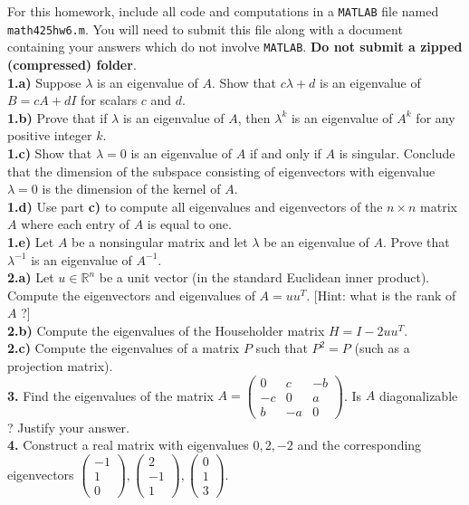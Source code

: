 \documentclass[11pt]{amsart}
\theoremstyle{definition}  %
\begin{document}


\noindent For this homework, include all code and computations in a {\tt MATLAB} file named {\tt math425hw6.m}.
You will need to submit this file along with a document containing your answers which do not
involve {\tt MATLAB}. {\bf Do not submit a zipped (compressed) folder}. \\

\noindent
{\bf 1.a)} Suppose $\lambda$ is an eigenvalue of $A$. Show that $c\lambda +d$ is an eigenvalue of $B = cA+dI$ for scalars $c$ and $d$.  \\
{\bf 1.b)} Prove that if $\lambda$ is an eigenvalue of $A$, then $\lambda^k$ is an eigenvalue of $A^k$ for any positive integer $k$. \\
{\bf 1.c)} Show that $\lambda = 0$ is an eigenvalue of $A$ if and only if $A$ is singular. Conclude that the dimension of the subspace consisting of eigenvectors
with eigenvalue $\lambda = 0$ is the dimension of the kernel of $A$.\\
{\bf 1.d)} Use part {\bf c)} to compute all eigenvalues and eigenvectors of the $n \times n$ matrix $A$ where each entry of $A$ is equal to one. \\
{\bf 1.e)} Let $A$ be a nonsingular matrix and let $\lambda$ be an eigenvalue of $A$. Prove that $\lambda^{-1}$ is an eigenvalue of $A^{-1}$. \\

\noindent
{\bf 2.a)}  Let $u \in \mathbb{R}^n$ be a unit vector (in the standard Euclidean inner product). Compute the eigenvectors and eigenvalues of $A = uu^T$. [Hint: what is the rank of $A$ ?] \\
{\bf 2.b)} Compute the eigenvalues of the Householder matrix $H = I -2uu^T$. \\
{\bf 2.c)} Compute the eigenvalues of a matrix $P$ such that $P^2 = P$ (such as a projection matrix). \\


\noindent
{\bf 3.}  Find the eigenvalues of the matrix $A = \begin{pmatrix} 0 & c & -b \\ -c & 0 & a \\ b & -a & 0 \end{pmatrix}$. Is $A$ diagonalizable ? Justify your answer. \\

\noindent
{\bf 4.} Construct a real matrix with eigenvalues $0, 2, -2$ and the corresponding eigenvectors
$\begin{pmatrix} -1 \\ 1 \\ 0 \end{pmatrix}, \begin{pmatrix} 2 \\ -1 \\ 1 \end{pmatrix}, \begin{pmatrix} 0 \\ 1 \\ 3 \end{pmatrix}$. \\
\end{document}
